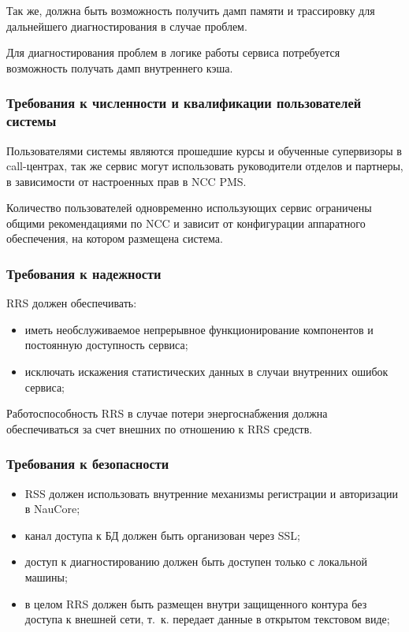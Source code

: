Так же, должна быть возможность получить дамп памяти и трассировку для дальнейшего диагностирования в случае проблем.

Для диагностирования проблем в логике работы сервиса потребуется возможность получать дамп внутреннего кэша.

\subsubsection{Требования к численности и квалификации пользователей системы} %

Пользователями системы являются прошедшие курсы и обученные супервизоры в call-центрах,
так же сервис могут использовать руководители отделов и партнеры,
в зависимости от настроенных прав в NCC PMS\@.

Количество пользователей одновременно использующих сервис ограничены
общими рекомендациями по NCC и зависит от конфигурации аппаратного обеспечения,
на котором размещена система.

\subsubsection{Требования к надежности}

RRS должен обеспечивать:
\begin{itemize}
    \item иметь необслуживаемое непрерывное функционирование компонентов и постоянную доступность сервиса;
    \item исключать искажения статистических данных в случаи внутренних ошибок сервиса;
\end{itemize}

Работоспособность RRS в случае потери энергоснабжения должна обеспечиваться за счет внешних по отношению к RRS средств.

\subsubsection{Требования к безопасности}
\begin{itemize}
    \item RSS должен использовать внутренние механизмы регистрации и авторизации в NauCore;
    \item канал доступа к БД должен быть организован через SSL\@;
    \item доступ к диагностированию должен быть доступен только с локальной машины;
    \item в целом RRS должен быть размещен внутри защищенного контура без доступа к внешней сети, т.~к. передает данные в открытом текстовом виде;
\end{itemize}

